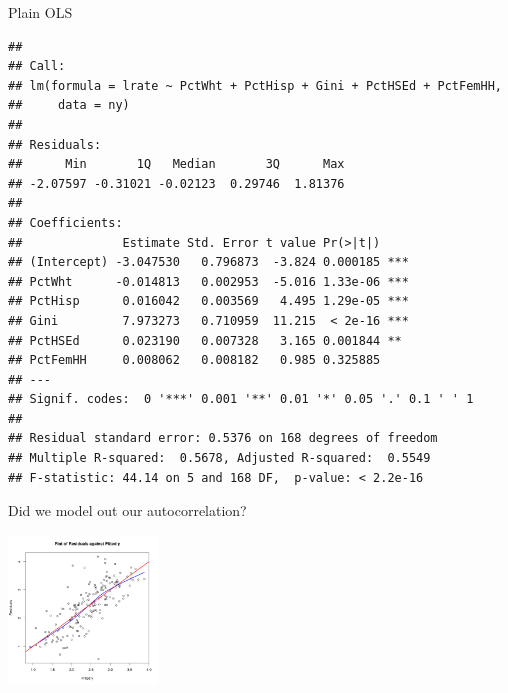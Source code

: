\documentclass[aspectratio = 169, 12pt]{beamer}\usepackage[]{graphicx}\usepackage[]{color}
\makeatletter
\newenvironment{kframe}{%
 \def\at@end@of@kframe{}%
 \ifinner\ifhmode%
  \def\at@end@of@kframe{\end{minipage}}%
  \begin{minipage}{\columnwidth}%
 \fi\fi%
 \def\FrameCommand##1{\hskip\@totalleftmargin \hskip-\fboxsep
 \colorbox{shadecolor}{##1}\hskip-\fboxsep
     \hskip-\linewidth \hskip-\@totalleftmargin \hskip\columnwidth}%
 \MakeFramed {\advance\hsize-\width
   \@totalleftmargin\z@ \linewidth\hsize
   \@setminipage}}%
 {\par\unskip\endMakeFramed%
 \at@end@of@kframe}
\newenvironment{knitrout}{}{} %
\makeatother
\begin{document}
\begin{frame}[fragile]{Plain OLS}
\begin{knitrout}\tiny
{}\color{fgcolor}\begin{kframe}


{\ttfamily\noindent\bfseries\color{errorcolor}{\#\# Error in ogrInfo(dsn = dsn, layer = layer, encoding = encoding, use\_iconv = use\_iconv, : Cannot open data source}}\begin{verbatim}
## 
## Call:
## lm(formula = lrate ~ PctWht + PctHisp + Gini + PctHSEd + PctFemHH, 
##     data = ny)
## 
## Residuals:
##      Min       1Q   Median       3Q      Max 
## -2.07597 -0.31021 -0.02123  0.29746  1.81376 
## 
## Coefficients:
##              Estimate Std. Error t value Pr(>|t|)    
## (Intercept) -3.047530   0.796873  -3.824 0.000185 ***
## PctWht      -0.014813   0.002953  -5.016 1.33e-06 ***
## PctHisp      0.016042   0.003569   4.495 1.29e-05 ***
## Gini         7.973273   0.710959  11.215  < 2e-16 ***
## PctHSEd      0.023190   0.007328   3.165 0.001844 ** 
## PctFemHH     0.008062   0.008182   0.985 0.325885    
## ---
## Signif. codes:  0 '***' 0.001 '**' 0.01 '*' 0.05 '.' 0.1 ' ' 1
## 
## Residual standard error: 0.5376 on 168 degrees of freedom
## Multiple R-squared:  0.5678,	Adjusted R-squared:  0.5549 
## F-statistic: 44.14 on 5 and 168 DF,  p-value: < 2.2e-16
\end{verbatim}
\end{kframe}
\end{knitrout}
\end{frame}

\begin{frame}[fragile]{Did we model out our autocorrelation?}
\begin{knitrout}\tiny
{}\color{fgcolor}\begin{kframe}


{\ttfamily\noindent\bfseries\color{errorcolor}{\#\# Error in ogrInfo(dsn = dsn, layer = layer, encoding = encoding, use\_iconv = use\_iconv, : Cannot open data source}}\end{kframe}
\includegraphics[width=150px]{figure/unnamed-chunk-9-1} 

\end{knitrout}
\end{frame}
\end{document}
